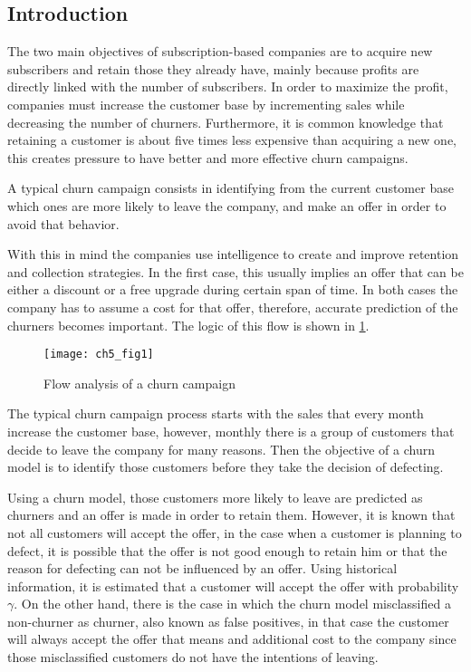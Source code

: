 \subsection{Introduction}
  The two main objectives of subscription-based companies are to  acquire new subscribers and 
retain those they already have, mainly because profits are directly linked with the number of 
subscribers.  In order to maximize the profit, companies must increase the customer base by 
incrementing sales  while decreasing the number of churners. Furthermore, it is common knowledge 
that retaining a  customer is about five times less expensive than acquiring a new 
one\citep{Farris2010}, this creates  pressure to have better and more effective churn campaigns.

 A typical churn campaign consists in identifying from the current customer base which ones are 
more likely to leave the company, and make an offer in order to avoid that behavior.

 	With this in mind the companies use intelligence to create and improve retention and collection
	strategies. In the first case, this usually implies an offer that can be either a discount or a 
	free upgrade during certain span of time. 
	In both cases the company has to 	assume a cost for 
	that offer, therefore, accurate prediction of the churners becomes important. The logic 
	of this flow is shown in \figurename{ \ref{fig:ch5:1}}.

	\begin{figure}[htbp]
	  \centering
    \texttt{[image: ch5\_fig1]}   %
	  \caption{Flow analysis of a churn campaign \citep{Verbraken2012}}
	  \label{fig:ch5:1}
	\end{figure}

The typical churn campaign process starts with the sales that every month increase the customer 
base, however, monthly there is a group of customers that decide to leave the company for many 
reasons. Then the objective of a churn model is to identify those customers before they take the 
decision of defecting.

Using a churn model, those customers more likely to leave are predicted as churners and 
an offer is made in order to retain them. However, it is known that not all customers will accept 
the offer, in the case when a customer is planning to defect, it is possible that the offer is not 
good enough to retain him or that the reason for defecting can not be influenced by an offer.
Using historical information, it is estimated that a customer will accept the offer with 
probability $\gamma$.
On the other hand, there is the case in which the churn model misclassified a non-churner as 
churner, also known as false positives, in that case the customer will always accept the offer that 
means and additional cost to the company since those misclassified customers do not have the 
intentions of leaving.

